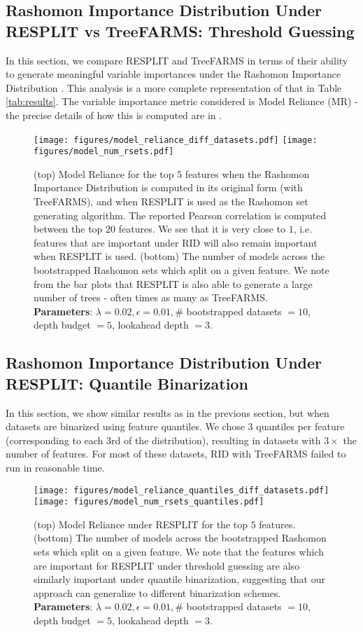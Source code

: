 \subsection{Rashomon Importance Distribution Under RESPLIT vs TreeFARMS: Threshold Guessing}
In this section, we compare RESPLIT and TreeFARMS in terms of their ability to generate meaningful variable importances under the Rashomon Importance Distribution \cite{donnelly2023the}. This analysis is a more complete representation of that in Table \ref{tab:results}. The variable importance metric considered is Model Reliance (MR) - the precise details of how this is computed are in \cite{donnelly2023the}.  
\begin{figure}[H]
    \centering
    \texttt{[image: figures/model\_reliance\_diff\_datasets.pdf]}
    \texttt{[image: figures/model\_num\_rsets.pdf]}
    \caption{(top) Model Reliance for the top $5$ features when the Rashomon Importance Distribution is computed in its original form (with TreeFARMS), and when RESPLIT is used as the Rashomon set generating algorithm. The reported Pearson correlation is computed between the top $20$ features. We see that it is very close to $1$, i.e. features that are important under RID will also remain important when RESPLIT is used. (bottom) The number of models across the bootstrapped Rashomon sets which split on a given feature. We note from the bar plots that RESPLIT is also able to generate a large number of trees - often times as many as TreeFARMS. \\ \textbf{Parameters}: $\lambda = 0.02, \epsilon = 0.01, \#$ bootstrapped datasets $=10$, depth budget $= 5$, lookahead depth $= 3$.}
    \label{fig:rid_under_resplit_vs_treefarms}
\end{figure}
\subsection{Rashomon Importance Distribution Under RESPLIT: Quantile Binarization}
In this section, we show similar results as in the previous section, but when datasets are binarized using feature quantiles. We chose $3$ quantiles per feature (corresponding to each $3$rd of the distribution), resulting in datasets with $3\times$ the number of features. For most of these datasets, RID with TreeFARMS failed to run in reasonable time.
\begin{figure}[H]
    \centering
    \texttt{[image: figures/model\_reliance\_quantiles\_diff\_datasets.pdf]}
    \texttt{[image: figures/model\_num\_rsets\_quantiles.pdf]}
    \caption{(top) Model Reliance under RESPLIT for the top $5$ features. (bottom) The number of models across the bootstrapped Rashomon sets which split on a given feature. We note that the features which are important for RESPLIT under threshold guessing are also similarly important under quantile binarization, suggesting that our approach can generalize to different binarization schemes.\\ \textbf{Parameters}: $\lambda = 0.02, \epsilon = 0.01, \#$ bootstrapped datasets $=10$, depth budget $= 5$, lookahead depth $= 3$. }
    \label{fig:rid_under_resplit_quantile}
\end{figure}
